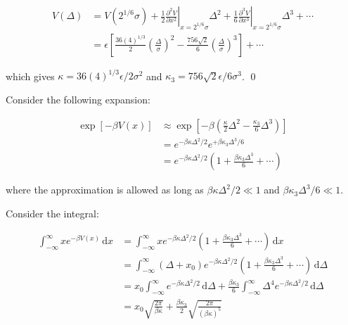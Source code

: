 \documentclass[12pt]{article}
\begin{document}
\begin{equation}
    \begin{split}
        V(\Delta) &= V(2^{1/6} \sigma) + \frac{1}{2} \left. \frac{\partial^{2} V}{\partial x^{2}} \right|_{x = 2^{1/6}\sigma} \Delta^{2} + \frac{1}{6} \left. \frac{\partial^{3} V}{\partial x^{3}} \right|_{x = 2^{1/6}\sigma} \Delta^{3} + \cdots \\
        &= \epsilon \left[ \frac{36 (4)^{1/3}}{2} \left( \frac{\Delta}{\sigma} \right)^{2} - \frac{756\sqrt{2}}{6} \left( \frac{\Delta}{\sigma} \right)^{3} \right] + \cdots
    \end{split}
\end{equation}

which gives $\kappa = 36 (4)^{1/3} \epsilon / 2\sigma^{2}$ and $\kappa_{3} = 756\sqrt{2} \epsilon / 6\sigma^{3}$.
\qed




Consider the following expansion:

\begin{equation}
    \begin{split}
        \exp[-\beta V(x)] &\approx \exp \left[ -\beta \left( \frac{\kappa}{2} \Delta^{2} - \frac{\kappa_{3}}{6} \Delta^{3} \right) \right] \\
        &= e^{-\beta \kappa \Delta^{2}/2} e^{+\beta \kappa_{3} \Delta^{3}/6} \\
        &= e^{-\beta \kappa \Delta^{2}/2} \left( 1 + \frac{\beta \kappa_{3} \Delta^{3}}{6} + \cdots \right)
    \end{split}
\end{equation}

where the approximation is allowed as long as $\beta \kappa \Delta^{2}/2 \ll 1$ and $\beta \kappa_{3} \Delta^{3}/6 \ll 1$.

Consider the integral:

\begin{equation}
    \begin{split}
        \int_{-\infty}^{\infty} x e^{-\beta V(x)} \, \mathrm{d}x &= \int_{-\infty}^{\infty} x e^{-\beta \kappa \Delta^{2}/2} \left( 1 + \frac{\beta \kappa_{3} \Delta^{3}}{6} + \cdots \right) \, \mathrm{d}x \\
        &= \int_{-\infty}^{\infty} (\Delta + x_{0}) e^{-\beta \kappa \Delta^{2}/2} \left( 1 + \frac{\beta \kappa_{3} \Delta^{3}}{6} + \cdots \right) \, \mathrm{d}\Delta \\
        &= x_{0} \int_{-\infty}^{\infty} e^{-\beta \kappa \Delta^{2}/2} \, \mathrm{d}\Delta + \frac{\beta \kappa_{3}}{6} \int_{-\infty}^{\infty} \Delta^{4} e^{-\beta \kappa \Delta^{2}/2} \, \mathrm{d}\Delta \\
        &= x_{0} \sqrt{\frac{2\pi}{\beta \kappa}} + \frac{\beta \kappa_{3}}{2} \sqrt{\frac{2\pi}{(\beta \kappa)^{5}}}
    \end{split}
\end{equation}
\end{document}
